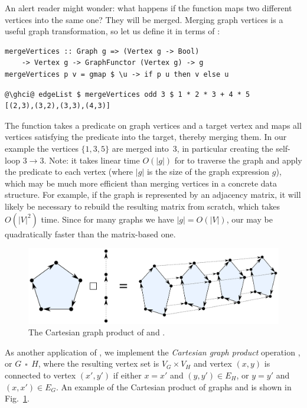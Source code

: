 An alert reader might wonder: what happens if the function maps two different
vertices into the same one? They will be merged. Merging graph vertices is
a useful graph transformation, so let us define it in terms of :

\begin{verbatim}
mergeVertices :: Graph g => (Vertex g -> Bool)
    -> Vertex g -> GraphFunctor (Vertex g) -> g
mergeVertices p v = gmap $ \u -> if p u then v else u
\end{verbatim}
\vspace{-1mm}
\begin{verbatim}
@\ghci@ edgeList $ mergeVertices odd 3 $ 1 * 2 * 3 + 4 * 5
[(2,3),(3,2),(3,3),(4,3)]
\end{verbatim}
\vspace{-1mm}
The function takes a predicate on graph vertices and a target vertex and
maps all vertices satisfying the predicate into the target, thereby
merging them. In our example the  vertices $\{1, 3, 5\}$ are merged
into~3, in particular creating the self-loop $3 \rightarrow 3$. Note: it takes
linear time $O(|g|)$ for  to traverse the graph and apply the
predicate to each vertex (where $|g|$ is the size of the graph expression $g$),
which may be much more efficient than merging vertices in a concrete data
structure. For example, if the graph is represented by an adjacency matrix, it
will likely be necessary to rebuild the resulting matrix from scratch, which
takes $O(|V|^2)$ time. Since for many graphs we have $|g| = O(|V|)$, our
 may be quadratically faster than the matrix-based one.

\begin{figure}
\centerline{\includegraphics[scale=0.36]{fig/graph-product.pdf}}
\caption{The Cartesian graph product of  and .\label{fig-product}}
\end{figure}

As another application of , we implement the \emph{Cartesian graph
product} operation , or $G~~\square~~H$, where the resulting vertex set is
$V_G \times V_H$ and vertex $(x, y)$ is connected to vertex $(x', y')$ if
either $x = x'$ and $(y, y') \in E_H$, or $y = y'$ and $(x,x')\in E_G$. An example of the Cartesian product of graphs 
and  is shown in Fig.~\ref{fig-product}.

